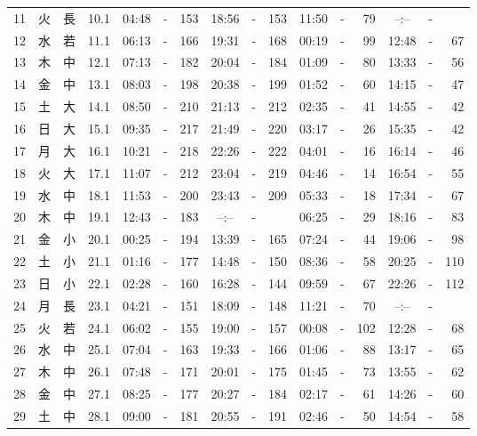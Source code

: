 \documentclass[12pt.a4j]{jsarticle}
\begin{document}
\begin{center}
\begin{table}[ht]
\begin{tabular}{|rc|cr|ccrccr|ccrccr|}
11 & 火 & 長 & 10.1 &  04:48 &-& 153  &  18:56 &-& 153  &   11:50 &-&  79  &   --:-- &-&     \\
12 & 水 & 若 & 11.1 &  06:13 &-& 166  &  19:31 &-& 168  &   00:19 &-&  99  &   12:48 &-&  67  \\
13 & 木 & 中 & 12.1 &  07:13 &-& 182  &  20:04 &-& 184  &   01:09 &-&  80  &   13:33 &-&  56  \\
14 & 金 & 中 & 13.1 &  08:03 &-& 198  &  20:38 &-& 199  &   01:52 &-&  60  &   14:15 &-&  47  \\
15 & 土 & 大 & 14.1 &  08:50 &-& 210  &  21:13 &-& 212  &   02:35 &-&  41  &   14:55 &-&  42  \\
16 & 日 & 大 & 15.1 &  09:35 &-& 217  &  21:49 &-& 220  &   03:17 &-&  26  &   15:35 &-&  42  \\
17 & 月 & 大 & 16.1 &  10:21 &-& 218  &  22:26 &-& 222  &   04:01 &-&  16  &   16:14 &-&  46  \\
18 & 火 & 大 & 17.1 &  11:07 &-& 212  &  23:04 &-& 219  &   04:46 &-&  14  &   16:54 &-&  55  \\
19 & 水 & 中 & 18.1 &  11:53 &-& 200  &  23:43 &-& 209  &   05:33 &-&  18  &   17:34 &-&  67  \\
20 & 木 & 中 & 19.1 &  12:43 &-& 183  &  --:-- &-&     &   06:25 &-&  29  &   18:16 &-&  83  \\
21 & 金 & 小 & 20.1 &  00:25 &-& 194  &  13:39 &-& 165  &   07:24 &-&  44  &   19:06 &-&  98  \\
22 & 土 & 小 & 21.1 &  01:16 &-& 177  &  14:48 &-& 150  &   08:36 &-&  58  &   20:25 &-& 110  \\
23 & 日 & 小 & 22.1 &  02:28 &-& 160  &  16:28 &-& 144  &   09:59 &-&  67  &   22:26 &-& 112  \\
24 & 月 & 長 & 23.1 &  04:21 &-& 151  &  18:09 &-& 148  &   11:21 &-&  70  &   --:-- &-&     \\
25 & 火 & 若 & 24.1 &  06:02 &-& 155  &  19:00 &-& 157  &   00:08 &-& 102  &   12:28 &-&  68  \\
26 & 水 & 中 & 25.1 &  07:04 &-& 163  &  19:33 &-& 166  &   01:06 &-&  88  &   13:17 &-&  65  \\
27 & 木 & 中 & 26.1 &  07:48 &-& 171  &  20:01 &-& 175  &   01:45 &-&  73  &   13:55 &-&  62  \\
28 & 金 & 中 & 27.1 &  08:25 &-& 177  &  20:27 &-& 184  &   02:17 &-&  61  &   14:26 &-&  60  \\
29 & 土 & 中 & 28.1 &  09:00 &-& 181  &  20:55 &-& 191  &   02:46 &-&  50  &   14:54 &-&  58  \\

\end{tabular}
\end{table}
\end{center}
\end{document}
